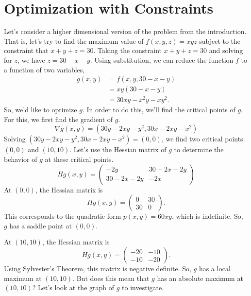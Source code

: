 \documentclass{ximera}
\begin{document}
\section*{Optimization with Constraints}

Let's consider a higher dimensional version of the problem from the introduction. That is, let's try to find the maximum value of $f(x,y,z) = xyz$ subject to the constraint that $x+y+z=30$. Taking the constraint $x+y+z=30$ and solving for $z$, we have $z = 30-x-y$. Using substitution, we can reduce the function $f$ to a function of two variables,
\begin{align*}
g(x,y) &= f(x,y,30-x-y)\\
&= xy(30-x-y)\\
&= 30xy-x^2y-xy^2.
\end{align*}
So, we'd like to optimize $g$. In order to do this, we'll find the critical points of $g$. For this, we first find the gradient of $g$.
\[
\nabla g(x,y) = (30y-2xy-y^2, 30x-2xy-x^2)
\]
Solving $(30y-2xy-y^2, 30x-2xy-x^2) = (0,0)$, we find two critical points: $(0,0)$ and $(10,10)$. Let's use the Hessian matrix of $g$ to determine the behavior of $g$ at these critical points.
\[
Hg(x,y) = \begin{pmatrix}
-2y & 30-2x-2y\\
30-2x-2y & -2x
\end{pmatrix}
\]
At $(0,0)$, the Hessian matrix is
\[
Hg(x,y) = \begin{pmatrix}
0 & 30\\
30 & 0
\end{pmatrix}.
\]
This corresponds to the quadratic form $p(x,y) = 60xy$, which is indefinite. So, $g$ has a saddle point at $(0,0)$.

At $(10,10)$, the Hessian matrix is
\[
Hg(x,y) = \begin{pmatrix}
-20 & -10\\
-10 & -20
\end{pmatrix}.
\]
Using Sylvester's Theorem, this matrix is negative definite. So, $g$ has a local maximum at $(10,10)$. But does this mean that $g$ has an absolute maximum at $(10,10)$? Let's look at the graph of $g$ to investigate.
\end{document}

